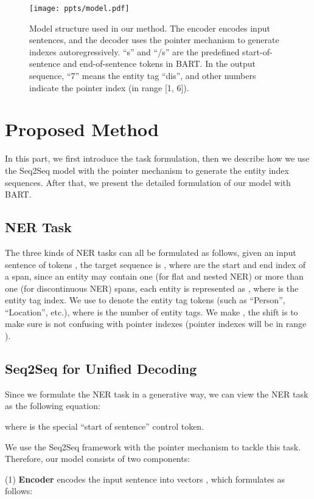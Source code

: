 \documentclass[11pt,a4paper]{article}
\begin{document}
\begin{figure*}[t]
\centering
  \texttt{[image: ppts/model.pdf]}
  \caption{Model structure used in our method. The encoder encodes input sentences, and the decoder uses the pointer mechanism to generate indexes autoregressively. ``s'' and ``/s'' are the predefined start-of-sentence and end-of-sentence tokens in BART. In the output sequence, ``7'' means the entity tag ``dis'', and other numbers indicate the pointer index (in range [1, 6]).}\label{fig:strucutre}
\end{figure*}

\section{Proposed Method}
In this part, we first introduce the task formulation, then we describe how we use the Seq2Seq model with the pointer mechanism to generate the entity index sequences. After that, we present the detailed formulation of our model with BART.


\subsection{NER Task}
The three kinds of NER tasks can all be formulated as follows, given an input sentence of  tokens ,  the target sequence is , where  are the start and end index of a span, since an entity may contain one (for flat and nested NER) or more than one (for discontinuous NER) spans, each entity is represented as , where  is the entity tag index. We use  to denote the entity tag tokens (such as ``Person'', ``Location'', etc.), where  is the number of entity tags.  We make , the  shift is to make sure  is not confusing with pointer indexes (pointer indexes will be in range ).


\subsection{Seq2Seq for Unified Decoding}
Since we formulate the NER task in a generative way, we can view the NER task as the following equation:

where  is the special ``start of sentence'' control token.

We use the Seq2Seq framework with the pointer mechanism to tackle this task. Therefore, our model consists of two components:

(1) \textbf{Encoder} encodes the input sentence  into vectors , which formulates as follows:
\end{document}
